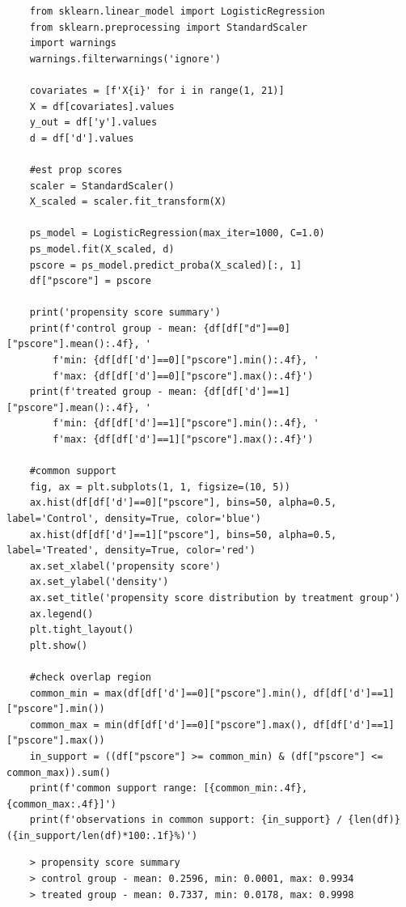 \documentclass[10pt]{article}
\begin{document}
\begin{lstlisting}
    from sklearn.linear_model import LogisticRegression
    from sklearn.preprocessing import StandardScaler
    import warnings
    warnings.filterwarnings('ignore')

    covariates = [f'X{i}' for i in range(1, 21)]
    X = df[covariates].values
    y_out = df['y'].values
    d = df['d'].values

    #est prop scores
    scaler = StandardScaler()
    X_scaled = scaler.fit_transform(X)

    ps_model = LogisticRegression(max_iter=1000, C=1.0)
    ps_model.fit(X_scaled, d)
    pscore = ps_model.predict_proba(X_scaled)[:, 1]
    df["pscore"] = pscore

    print('propensity score summary')
    print(f'control group - mean: {df[df["d"]==0]["pscore"].mean():.4f}, '
        f'min: {df[df['d']==0]["pscore"].min():.4f}, '
        f'max: {df[df['d']==0]["pscore"].max():.4f}')
    print(f'treated group - mean: {df[df['d']==1]["pscore"].mean():.4f}, '
        f'min: {df[df['d']==1]["pscore"].min():.4f}, '
        f'max: {df[df['d']==1]["pscore"].max():.4f}')

    #common support 
    fig, ax = plt.subplots(1, 1, figsize=(10, 5))
    ax.hist(df[df['d']==0]["pscore"], bins=50, alpha=0.5, label='Control', density=True, color='blue')
    ax.hist(df[df['d']==1]["pscore"], bins=50, alpha=0.5, label='Treated', density=True, color='red')
    ax.set_xlabel('propensity score')
    ax.set_ylabel('density')
    ax.set_title('propensity score distribution by treatment group')
    ax.legend()
    plt.tight_layout()
    plt.show()

    #check overlap region
    common_min = max(df[df['d']==0]["pscore"].min(), df[df['d']==1]["pscore"].min())
    common_max = min(df[df['d']==0]["pscore"].max(), df[df['d']==1]["pscore"].max())
    in_support = ((df["pscore"] >= common_min) & (df["pscore"] <= common_max)).sum()
    print(f'common support range: [{common_min:.4f}, {common_max:.4f}]')
    print(f'observations in common support: {in_support} / {len(df)} ({in_support/len(df)*100:.1f}%)')
\end{lstlisting}
\begin{verbatim}
    > propensity score summary
    > control group - mean: 0.2596, min: 0.0001, max: 0.9934
    > treated group - mean: 0.7337, min: 0.0178, max: 0.9998
\end{verbatim}
\end{document}

